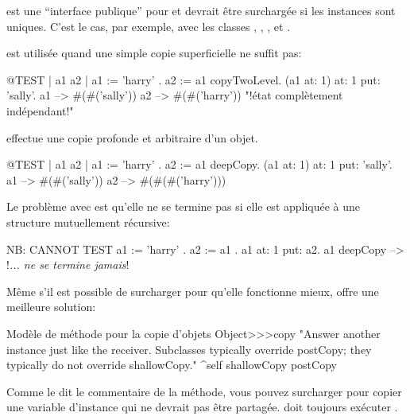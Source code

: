 \documentclass[a4paper,10pt,twoside]{book}
\begin{document}
 est une ``interface publique'' pour  et devrait \^etre surcharg\'ee si les instances sont uniques. C'est le cas, par exemple, avec les classes , , ,  et .

 est utilis\'ee quand une simple copie superficielle ne suffit pas:

\begin{code}{@TEST | a1 a2 |}
a1 := { { 'harry' } } .
a2 := a1 copyTwoLevel.
(a1 at: 1) at: 1 put: 'sally'.
a1 --> #(#('sally'))
a2 --> #(#('harry'))    "!\'etat compl\`etement ind\'ependant!"
\end{code}

 effectue une copie profonde et arbitraire d'un objet.

\begin{code}{@TEST | a1 a2 |}
a1 := { { { 'harry' } } } .
a2 := a1 deepCopy.
(a1 at: 1) at: 1 put: 'sally'.
a1 --> #(#('sally'))
a2 --> #(#(#('harry')))
\end{code}

Le probl\`eme avec  est qu'elle ne se termine pas si elle est appliqu\'ee \`a une structure mutuellement r\'ecursive:

\begin{code}{NB: CANNOT TEST}
a1 := { 'harry' }.
a2 := { a1 }.
a1 at: 1 put: a2.
a1 deepCopy --> !\emph{... ne se termine jamais}!
\end{code}

M\^eme s'il est possible de surcharger  pour qu'elle fonctionne mieux,  offre une meilleure solution:

\begin{method}{Mod\`ele de m\'ethode pour la copie d'objets}
Object>>>copy
    "Answer another instance just like the receiver. Subclasses typically override postCopy;
    they typically do not override shallowCopy."
    ^self shallowCopy postCopy
\end{method}

Comme le dit le commentaire de la m\'ethode,
vous pouvez surcharger  pour copier une variable d'instance qui ne devrait pas \^etre partag\'ee.  doit toujours ex\'ecuter .

\end{document}
